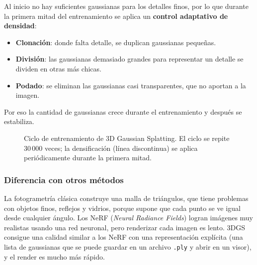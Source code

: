\documentclass[conference,a4paper]{IEEEtran}
\begin{document}
Al inicio no hay suficientes gaussianas para los detalles finos, por lo que durante la primera mitad del entrenamiento se aplica un \textbf{control adaptativo de densidad}:
\begin{itemize}
\item \textbf{Clonación}: donde falta detalle, se duplican gaussianas pequeñas.
\item \textbf{División}: las gaussianas demasiado grandes para representar un detalle se dividen en otras más chicas.
\item \textbf{Podado}: se eliminan las gaussianas casi transparentes, que no aportan a la imagen.
\end{itemize}
Por eso la cantidad de gaussianas crece durante el entrenamiento y después se estabiliza.

\begin{figure}[htbp]
\centering
{}
\caption{Ciclo de entrenamiento de 3D Gaussian Splatting. El ciclo se repite 30\,000 veces; la densificación (línea discontinua) se aplica periódicamente durante la primera mitad.}
\label{fig:ciclo3dgs}
\end{figure}

\subsubsection{Diferencia con otros métodos}
La fotogrametría clásica construye una malla de triángulos, que tiene problemas con objetos finos, reflejos y vidrios, porque supone que cada punto se ve igual desde cualquier ángulo. Los NeRF (\textit{Neural Radiance Fields}) logran imágenes muy realistas usando una red neuronal, pero renderizar cada imagen es lento. 3DGS consigue una calidad similar a los NeRF con una representación explícita (una lista de gaussianas que se puede guardar en un archivo \texttt{.ply} y abrir en un visor), y el render es mucho más rápido.
\end{document}
